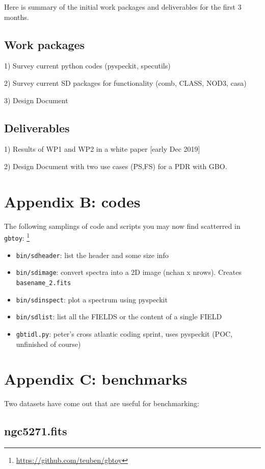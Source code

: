 \documentclass[12pt,a4paper]{article}
\begin{document}
Here is summary of the initial work packages and deliverables for the first 3 months.
\subsection{Work packages}

1) Survey current python codes (pyspeckit, specutils)

2) Survey current SD packages for functionality (comb, CLASS, NOD3, casa)

3) Design Document

\subsection{Deliverables}

1) Results of WP1 and WP2 in a white paper [early Dec 2019]

2) Design Document with two use cases (PS,FS) for a PDR with GBO.

\section*{Appendix B: codes}

The following samplings of code and scripts you may now find scatterred in {\tt gbtoy}:
\footnote{\url{https://github.com/teuben/gbtoy}}

\begin{itemize}
  \item {\tt bin/sdheader}:  list the header and some size info
  \item {\tt bin/sdimage}:    convert spectra into a 2D image (nchan x nrows). Creates {\tt basename\_2.fits}
  \item {\tt bin/sdinspect}:  plot a spectrum using pyspeckit
  \item {\tt bin/sdlist}:  list all the FIELDS or the content of a single FIELD
  \item {\tt gbtidl.py}: peter's cross atlantic coding sprint, uses pyspeckit (POC, unfinished of course)
\end{itemize}       

\section*{Appendix C: benchmarks}

Two datasets have come out that are useful for benchmarking:

\subsection{ngc5271.fits}
\end{document}
